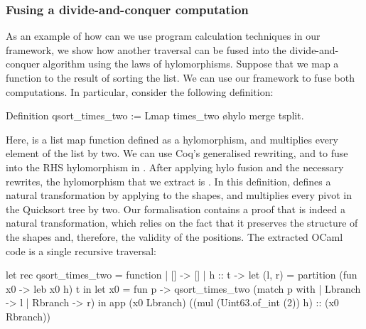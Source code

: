 \documentclass[ a4paper, UKenglish, cleveref, autoref, thm-restate]{lipics-v2021}
\begin{document}
\subsubsection{Fusing a divide-and-conquer computation}
As an example of how can we use program calculation techniques in our 
framework, we show how another traversal can be fused into the
divide-and-conquer algorithm using the laws of hylomorphisms.
Suppose that we map a function to the result of sorting the list. We can
use our framework to fuse both computations. In particular, consider
the following definition:
\begin{coqcode}
Definition qsort_times_two := Lmap times_two \o hylo merge tsplit.
\end{coqcode}
Here,  is a list map function defined as a hylomorphism,
and  multiplies every element of the list by two.
We can use Coq's generalised rewriting, and  to fuse
 into the RHS hylomorphism in .
After applying hylo fusion and the necessary rewrites, the hylomorphism that we
extract is . In this definition,
 defines a natural transformation by applying  to
the shapes, and  multiplies every pivot in the Quicksort tree by
two. Our formalisation contains a proof that  is indeed a natural
transformation, which relies on the fact that it preserves the structure of the
shapes and, therefore, the validity of the positions.  The extracted OCaml code
is a single recursive traversal:
\begin{ocamlcode}
let rec qsort_times_two = function
| [] -> []
| h :: t ->
  let (l, r) = partition (fun x0 -> leb x0 h) t in
  let x0 = fun p -> qsort_times_two (match p with
                                     | Lbranch -> l
                                     | Rbranch -> r) in
  app (x0 Lbranch) ((mul (Uint63.of_int (2)) h) :: (x0 Rbranch))
\end{ocamlcode}
\end{document}
